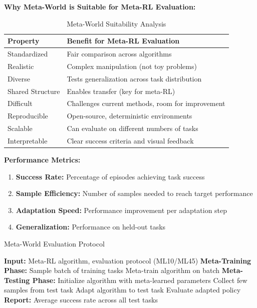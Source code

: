 \documentclass[12pt]{article}
\newcommand{\ieee}[1]{\textcolor{IEEEBlue}{\textbf{#1}}}
\begin{document}
{{			\ieee{Why Meta-World is Suitable for Meta-RL Evaluation:}
			
			\begin{table}[H]
			\centering
			\caption{Meta-World Suitability Analysis}
			\begin{tabular}{@{}ll@{}}
			\toprule
			\textbf{Property} & \textbf{Benefit for Meta-RL Evaluation} \\
			\midrule
			Standardized & Fair comparison across algorithms \\
			Realistic & Complex manipulation (not toy problems) \\
			Diverse & Tests generalization across task distribution \\
			Shared Structure & Enables transfer (key for meta-RL) \\
			Difficult & Challenges current methods, room for improvement \\
			Reproducible & Open-source, deterministic environments \\
			Scalable & Can evaluate on different numbers of tasks \\
			Interpretable & Clear success criteria and visual feedback \\
			\bottomrule
			\end{tabular}
			\label{tab:metaworld_suitability}
			\end{table}
			
			\ieee{Performance Metrics:}
			
			\begin{enumerate}
				\item \textbf{Success Rate:} Percentage of episodes achieving task success
				\item \textbf{Sample Efficiency:} Number of samples needed to reach target performance
				\item \textbf{Adaptation Speed:} Performance improvement per adaptation step
				\item \textbf{Generalization:} Performance on held-out tasks
			\end{enumerate}
			
			\begin{algorithm}[H]
			\caption{Meta-World Evaluation Protocol}
			\begin{algorithmic}[1]
			\STATE \textbf{Input:} Meta-RL algorithm, evaluation protocol (ML10/ML45)
			\STATE \textbf{Meta-Training Phase:}
			\STATE Sample batch of training tasks
			\STATE Meta-train algorithm on batch
			\ENDFOR
			\STATE \textbf{Meta-Testing Phase:}
			\STATE Initialize algorithm with meta-learned parameters
			\STATE Collect few samples from test task
			\STATE Adapt algorithm to test task
			\STATE Evaluate adapted policy
			\ENDFOR
			\ENDFOR
			\STATE \textbf{Report:} Average success rate across all test tasks
			\end{algorithmic}
			\end{algorithm}
			
}}
\end{document}
